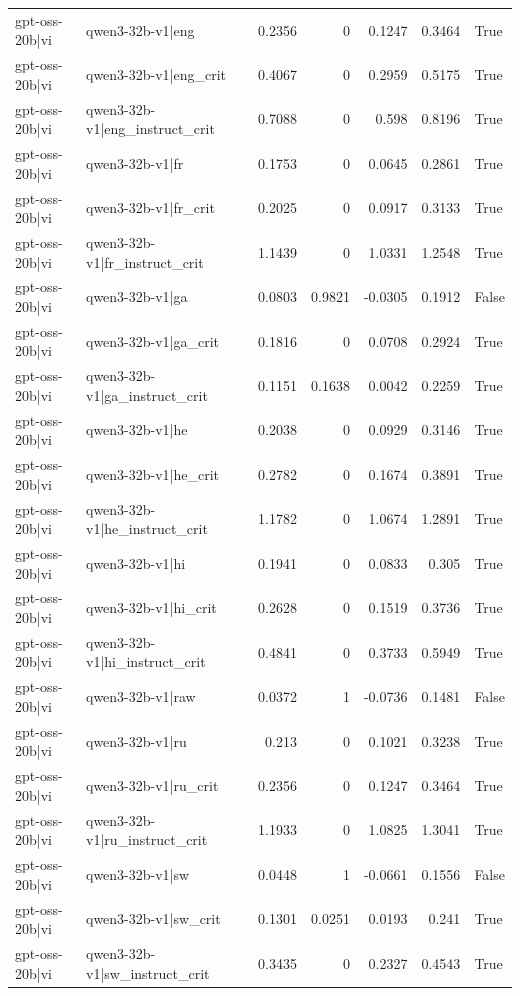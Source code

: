 \begin{table}
\begin{tabular}{l l r r r r l}
gpt-oss-20b|vi & qwen3-32b-v1|eng & 0.2356 & 0 & 0.1247 & 0.3464 & True \\
gpt-oss-20b|vi & qwen3-32b-v1|eng_crit & 0.4067 & 0 & 0.2959 & 0.5175 & True \\
gpt-oss-20b|vi & qwen3-32b-v1|eng_instruct_crit & 0.7088 & 0 & 0.598 & 0.8196 & True \\
gpt-oss-20b|vi & qwen3-32b-v1|fr & 0.1753 & 0 & 0.0645 & 0.2861 & True \\
gpt-oss-20b|vi & qwen3-32b-v1|fr_crit & 0.2025 & 0 & 0.0917 & 0.3133 & True \\
gpt-oss-20b|vi & qwen3-32b-v1|fr_instruct_crit & 1.1439 & 0 & 1.0331 & 1.2548 & True \\
gpt-oss-20b|vi & qwen3-32b-v1|ga & 0.0803 & 0.9821 & -0.0305 & 0.1912 & False \\
gpt-oss-20b|vi & qwen3-32b-v1|ga_crit & 0.1816 & 0 & 0.0708 & 0.2924 & True \\
gpt-oss-20b|vi & qwen3-32b-v1|ga_instruct_crit & 0.1151 & 0.1638 & 0.0042 & 0.2259 & True \\
gpt-oss-20b|vi & qwen3-32b-v1|he & 0.2038 & 0 & 0.0929 & 0.3146 & True \\
gpt-oss-20b|vi & qwen3-32b-v1|he_crit & 0.2782 & 0 & 0.1674 & 0.3891 & True \\
gpt-oss-20b|vi & qwen3-32b-v1|he_instruct_crit & 1.1782 & 0 & 1.0674 & 1.2891 & True \\
gpt-oss-20b|vi & qwen3-32b-v1|hi & 0.1941 & 0 & 0.0833 & 0.305 & True \\
gpt-oss-20b|vi & qwen3-32b-v1|hi_crit & 0.2628 & 0 & 0.1519 & 0.3736 & True \\
gpt-oss-20b|vi & qwen3-32b-v1|hi_instruct_crit & 0.4841 & 0 & 0.3733 & 0.5949 & True \\
gpt-oss-20b|vi & qwen3-32b-v1|raw & 0.0372 & 1 & -0.0736 & 0.1481 & False \\
gpt-oss-20b|vi & qwen3-32b-v1|ru & 0.213 & 0 & 0.1021 & 0.3238 & True \\
gpt-oss-20b|vi & qwen3-32b-v1|ru_crit & 0.2356 & 0 & 0.1247 & 0.3464 & True \\
gpt-oss-20b|vi & qwen3-32b-v1|ru_instruct_crit & 1.1933 & 0 & 1.0825 & 1.3041 & True \\
gpt-oss-20b|vi & qwen3-32b-v1|sw & 0.0448 & 1 & -0.0661 & 0.1556 & False \\
gpt-oss-20b|vi & qwen3-32b-v1|sw_crit & 0.1301 & 0.0251 & 0.0193 & 0.241 & True \\
gpt-oss-20b|vi & qwen3-32b-v1|sw_instruct_crit & 0.3435 & 0 & 0.2327 & 0.4543 & True \\

\end{tabular}
\end{table}
